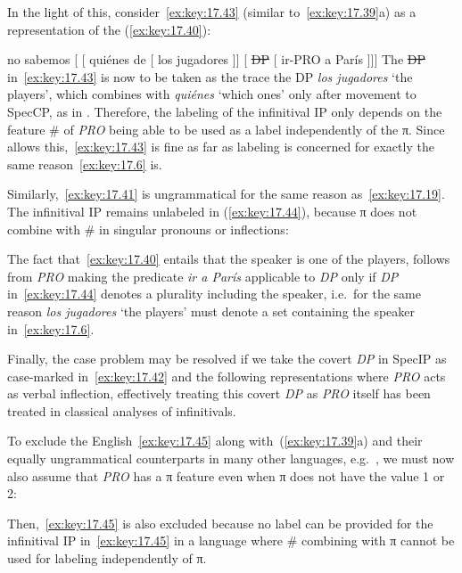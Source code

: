 \documentclass[output=paper]{langsci/langscibook}
\begin{document}
In the light of this, consider~\eqref{ex:key:17.43} (similar to~\eqref{ex:key:17.39}a) as
a representation of the  (\ref{ex:key:17.40}):

\ea\label{ex:key:17.43}
    no sabemos\tss{\Fpl} [ [ quiénes de [  los jugadores ]] [ \sout{DP} [ ir-PRO\tss{\Fpl} a París ]]]
\z
The \sout{DP} in~\eqref{ex:key:17.43} is now to be taken as the trace the DP
\emph{los jugadores} ‘the players’, which combines with \emph{quiénes} ‘which
ones’ only after movement to SpecCP, as in \citet{Sportiche2005}.  Therefore,
the labeling of the infinitival IP only depends on the feature \# of
\emph{PRO}\tss{\Fpl} being able to be used as a label independently of
the π. Since  allows this,~\eqref{ex:key:17.43} is fine as far as labeling is
concerned for exactly the same reason~\eqref{ex:key:17.6} is.

Similarly,~\eqref{ex:key:17.41} is ungrammatical for the same reason
as~\eqref{ex:key:17.19}. The infinitival IP remains unlabeled in
(\ref{ex:key:17.44}), because π does not combine with \# in singular pronouns or
inflections:

\ea[*]{%
    no sé\tss{\Fsg} [\tss{CP} [\tss{whP} quién de [\tss{DP} los jugadores]]] [\tss{IP} \sout{DP} [\tss{IP} ir-PRO\tss{\Fsg} a París ]]]
    }\label{ex:key:17.44}
\z
The fact that~\eqref{ex:key:17.40} entails that the speaker is one of the players,
follows from \emph{PRO} making the predicate \emph{ir a París}
applicable to \emph{DP} only if \emph{DP} in~\eqref{ex:key:17.44} denotes a
plurality including the speaker, i.e.\ for the same reason \emph{los jugadores}
‘the players’ must denote a set containing the speaker in~\eqref{ex:key:17.6}.

Finally, the case problem may be resolved if we take the covert \emph{DP} in
SpecIP as case-marked in~\eqref{ex:key:17.42} and the following representations
where \emph{PRO} acts as verbal inflection, effectively treating this covert
\emph{DP} as \emph{PRO} itself has been treated in classical analyses of
 infinitivals.

To exclude the English~\eqref{ex:key:17.45} along with~(\ref{ex:key:17.39}a) and their
equally ungrammatical counterparts in many other languages, e.g.\ , we
must now also assume that \emph{PRO} has a π feature even when π
does not have the value 1 or 2:

\label{ex:key:17.45}
\z
Then,~\eqref{ex:key:17.45} is also excluded because no label can be provided for the
infinitival IP in~\eqref{ex:key:17.45} in a language where \# combining with π
cannot be used for labeling independently of π.
\end{document}
